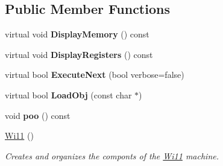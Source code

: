 \subsection*{Public Member Functions}
\begin{DoxyCompactItemize}
\item 
\hypertarget{classWi11_a0f532cefdebd3c33ddc93e8bce4dc06b}{
virtual void {\bfseries DisplayMemory} () const }
\label{classWi11_a0f532cefdebd3c33ddc93e8bce4dc06b}

\item 
\hypertarget{classWi11_a201359b2506539dda72075b908076492}{
virtual void {\bfseries DisplayRegisters} () const }
\label{classWi11_a201359b2506539dda72075b908076492}

\item 
\hypertarget{classWi11_ace44826e4f92aabd233b68bdd9437c1b}{
virtual bool {\bfseries ExecuteNext} (bool verbose=false)}
\label{classWi11_ace44826e4f92aabd233b68bdd9437c1b}

\item 
\hypertarget{classWi11_a50af76350b3e72c75d42035582aeb321}{
virtual bool {\bfseries LoadObj} (const char $\ast$)}
\label{classWi11_a50af76350b3e72c75d42035582aeb321}

\item 
\hypertarget{classWi11_a99a02dc05270d20ad6ad39823ee976b6}{
void {\bfseries poo} () const }
\label{classWi11_a99a02dc05270d20ad6ad39823ee976b6}

\item 
\hyperlink{classWi11_ad8e6d1a1e39832bdc650f2ca3cfa2d3e}{Wi11} ()
\begin{DoxyCompactList}\small\item\em Creates and organizes the componts of the \hyperlink{classWi11}{Wi11} machine. \item\end{DoxyCompactList}\end{DoxyCompactItemize}
